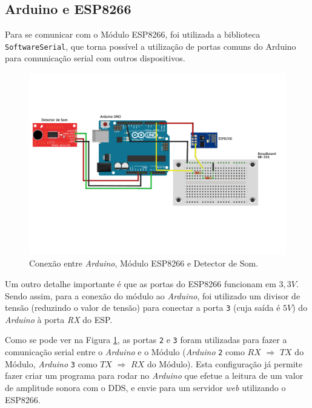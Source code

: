 \documentclass[
    12pt,               %
    openright,          %
    oneside,
    a4paper,            
    english,            %
    brazil              %
    ]{abntex2}
\begin{document}
\subsection{Arduino e ESP8266}

Para se comunicar com o Módulo ESP8266, foi utilizada a biblioteca \texttt{SoftwareSerial}, que torna possível a utilização de portas comuns do Arduino para comunicação serial com outros dispositivos. 

\begin{figure}[!htb]
  \begin{center}
    \caption{\label{circ-2}Conexão entre \textit{Arduino}, Módulo ESP8266 e Detector de Som.}
    \includegraphics[scale=0.48]{images/circ-2.pdf}
  \end{center}
\end{figure}

Um outro detalhe importante é que as portas do ESP8266 funcionam em $3,3V$. Sendo assim, para a conexão do módulo ao \textit{Arduino}, foi utilizado um divisor de tensão (reduzindo o valor de tensão) para conectar a porta \texttt{3} (cuja saída é $5V$) do \textit{Arduino} à porta \textit{RX} do ESP.

Como se pode ver na Figura \ref{circ-2}, as portas \texttt{2} e \texttt{3} foram utilizadas para fazer a comunicação serial entre o \textit{Arduino} e o Módulo (\textit{Arduino} \texttt{2} como $RX$ $\Rightarrow$ $TX$ do Módulo, \textit{Arduino} \texttt{3} como $TX$ $\Rightarrow$ $RX$ do Módulo). Esta configuração já permite fazer criar um programa para rodar no \textit{Arduino} que efetue a leitura de um valor de amplitude sonora com o DDS, e envie para um servidor \textit{web} utilizando o ESP8266.
\end{document}
